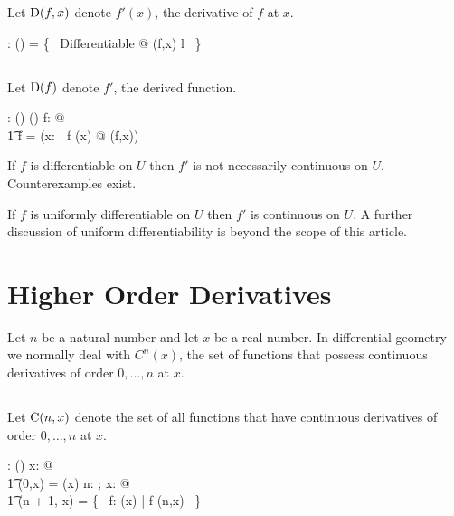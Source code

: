 \documentclass[11pt, oneside]{article}
\begin{document}
Let $\operatorname{D}(f,x)$ denote $f'(x)$, the derivative of $f$ at $x$.

\begin{axdef}
	\derivFR: (\R \pfun \R) \cross \R \pfun \R
\where
	\derivFR = \{~ Differentiable @ (f,x) \mapsto l ~\}
\end{axdef}

\subsection{}

Let $\operatorname{D}(f)$ denote $f'$, the derived function.

\begin{axdef}
	\derivF: (\R \pfun \R) \fun (\R \pfun \R)
\where
	\forall f: \R \pfun \R @ \\
		\t1	\derivF f = (\lambda x: \R | f \in \diffR(x) @ \derivFR(f,x)) 
\end{axdef}

\begin{remark}
If $f$ is differentiable on $U$ then $f'$ is not necessarily continuous on $U$.
Counterexamples exist.
\end{remark}

\begin{remark}
If $f$ is uniformly differentiable on $U$ then $f'$ is continuous on $U$.
A further discussion of uniform differentiability is beyond the scope of this article.
\end{remark}

\section{Higher Order Derivatives}

Let $n$ be a natural number and let $x$ be a real number.
In differential geometry we normally deal with $C^n(x)$, the set of functions
that possess continuous derivatives of order $0, \ldots, n$ at $x$.

\subsection{}

Let $\operatorname{C}(n,x)$ denote the set of all functions that have continuous derivatives of order $0, \ldots, n$ at $x$.

\begin{axdef}
	\CnR: \nat \cross \R \fun \power(\R \pfun \R)
\where
	\forall x: \R @ \\
	\t1	\CnR(0,x) = \CzeroR(x)
\also
	\forall n: \nat; x: \R @ \\
	\t1	\CnR(n + 1, x) = \{~ f: \diffR(x) | \derivF f \in \CnR(n,x) ~\}
\end{axdef}
\end{document}
